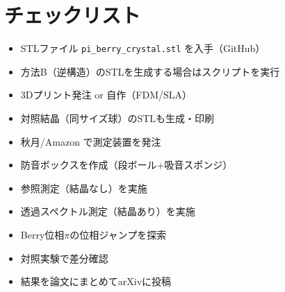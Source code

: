 \documentclass[11pt,a4paper]{article}
\begin{document}
\section{チェックリスト}

\begin{itemize}
\item[$\square$] STLファイル \texttt{pi\_berry\_crystal.stl} を入手（GitHub）
\item[$\square$] 方法B（逆構造）のSTLを生成する場合はスクリプトを実行
\item[$\square$] 3Dプリント発注 or 自作（FDM/SLA）
\item[$\square$] 対照結晶（同サイズ球）のSTLも生成・印刷
\item[$\square$] 秋月/Amazon で測定装置を発注
\item[$\square$] 防音ボックスを作成（段ボール+吸音スポンジ）
\item[$\square$] 参照測定（結晶なし）を実施
\item[$\square$] 透過スペクトル測定（結晶あり）を実施
\item[$\square$] Berry位相$\pi$の位相ジャンプを探索
\item[$\square$] 対照実験で差分確認
\item[$\square$] 結果を論文にまとめてarXivに投稿
\end{itemize}
\end{document}
